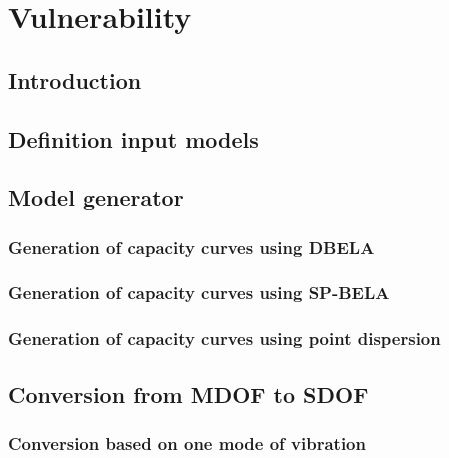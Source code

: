 \chapter{Vulnerability}
\label{chap:vulnerability}

    \section{Introduction}
    

    \section{Definition input models}
    

	\section{Model generator}
	\label{sec:model-gen}
	
		
		\subsection{Generation of capacity curves using DBELA}
		\label{subsec:DBELA}
		
		
		\subsection{Generation of capacity curves using SP-BELA}
		\label{subsec:DBELA}
		
		
		\subsection{Generation of capacity curves using point dispersion}
		\label{subsec:dispersion}
		
			
	\section{Conversion from MDOF to SDOF}
	\label{sec:mdof_to_sdof}
	
	
		\subsection{Conversion based on one mode of vibration}
		\label{subsec:one_mode}
		
		
